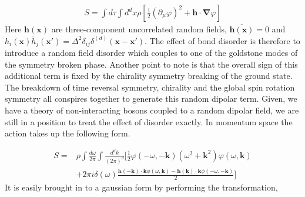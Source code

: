 \documentclass[notitlepage,onecolumn,showpacs,11pt]{revtex4-1}
\newcommand{\mbf}[1]{\mathbf{#1}}
\newcommand{\grad}{\boldsymbol{\nabla}}
\begin{document}
\begin{equation}
    \begin{aligned}
        S = \int d\tau\int d^d x\rho\left[\frac{1}{2}\left(\partial_\mu\varphi\right)^2 
        + \mbf{h}\cdot\grad\varphi\right]
    \end{aligned}
\end{equation}
Here $\mbf{h}(\mbf{x})$ are three-component uncorrelated random fields, 
$\overline{\mbf{h}(\mbf{x})}=0$ and $\overline{h_i(\mbf{x})
h_j(\mbf{x}')}=\Delta^2\delta_{ij}\delta^{(d)}(\mbf{x}-\mbf{x}')$. The effect of bond disorder
is therefore to introduce a random field disorder which couples to one of the goldstone 
modes of the symmetry broken phase. Another point to note is that the overall sign of this
additional term is fixed by the chirality symmetry breaking of the ground state. The breakdown
of time reversal symmetry, chirality and the global spin rotation symmetry all conspires
together to generate this random dipolar term. Given, we have a theory of non-interacting
bosons coupled to a random dipolar field, we are still in a position to treat the effect of
disorder exactly. In momentum space the action takes up the following form.

\begin{equation}
    \begin{aligned}
        S =& \rho\int \frac{d\omega}{2\pi}\int \frac{d^dk}{(2\pi)^d}
        \Big[\frac{1}{2}\varphi(-\omega,-\mbf{k})\left(\omega^2+\mbf{k}^2\right)
        \varphi(\omega,\mbf{k})\\
        &+
        2\pi i\delta(\omega)
        \frac{\mbf{h}(-\mbf{k})\cdot\mbf{k}\phi(\omega,\mbf{k})
        -\mbf{h}(\mbf{k})\cdot\mbf{k}\phi(-\omega,-\mbf{k})
        }{2}
        \Big]
    \end{aligned}
\end{equation}
It is easily brought in to a gaussian form by performing the transformation,
\end{document}
